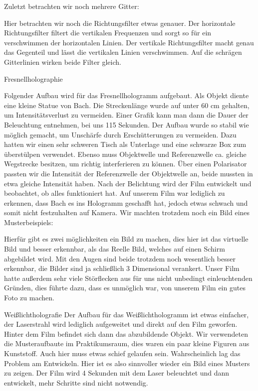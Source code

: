 Zuletzt betrachten wir noch mehrere Gitter:

Hier betrachten wir noch die Richtungsfilter etwas genauer.
Der horizontale Richtungsfilter filtert die vertikalen Frequenzen und sorgt so für ein verschwimmen der horizontalen Linien. Der vertikale Richtungsfilter macht genau das Gegenteil und lässt die vertikalen Linien verschwimmen. Auf die schrägen Gitterlinien wirken beide Filter gleich.

Fresnellholographie

Folgender Aufbau wird für das Fresnellhologramm aufgebaut. Als Objekt diente eine kleine Statue von Bach. Die Streckenlänge wurde auf unter 60 cm gehalten, um Intensitätsverlust zu vermeiden. Einer Grafik kann man dann die Dauer der Beleuchtung entnehmen, bei uns 115 Sekunden. Der Aufbau wurde so stabil wie möglich gemacht, um Unschärfe durch Erschütterungen zu vermeiden. Dazu hatten wir einen sehr schweren Tisch als Unterlage und eine schwarze Box zum überstülpen verwendet. Ebenso muss Objektwelle und Referenzwelle ca. gleiche Wegstrecke besitzen, um richtig interferieren zu können. Über einen Polarisator passten wir die Intensität der Referenzwelle der Objektwelle an, beide mussten in etwa gleiche Intensität haben.
Nach der Belichtung wird der Film entwickelt und beobachtet, ob alles funktioniert hat. Auf unserem Film war lediglich zu erkennen, dass Bach es ins Hologramm geschafft hat, jedoch etwas schwach und somit nicht festzuhalten auf Kamera. Wir machten trotzdem noch ein Bild eines Musterbeispiels:


Hierfür gibt es zwei möglichkeiten ein Bild zu machen, dies hier ist das virtuelle Bild und besser erkennbar, als das Reelle Bild, welches auf einen Schirm abgebildet wird. Mit den Augen sind beide trotzdem noch wesentlich besser erkennbar, die Bilder sind ja schließlich 3 Dimensional verankert.
Unser Film hatte außerdem sehr viele Störflecken aus für uns nicht unbedingt einleuchtenden Gründen, dies führte dazu, dass es unmöglich war, von unserem Film ein gutes Foto zu machen.

Weißlichtholografie
Der Aufbau für das Weißlichthologramm ist etwas einfacher, der Laserstrahl wird lediglich aufgeweitet und direkt auf den Film geworfen. Hinter dem Film befindet sich dann das abzubildende Objekt. Wir verwendeten die Musteraufbaute im Praktikumsraum, dies waren ein paar kleine Figuren aus Kunststoff. Auch hier muss etwas schief gelaufen sein. Wahrscheinlich lag das Problem am Entwickeln. Hier ist es also sinnvoller wieder ein Bild eines Musters zu zeigen. Der Film wird 4 Sekunden mit dem Laser beleuchtet und dann entwickelt, mehr Schritte sind nicht notwendig. 
